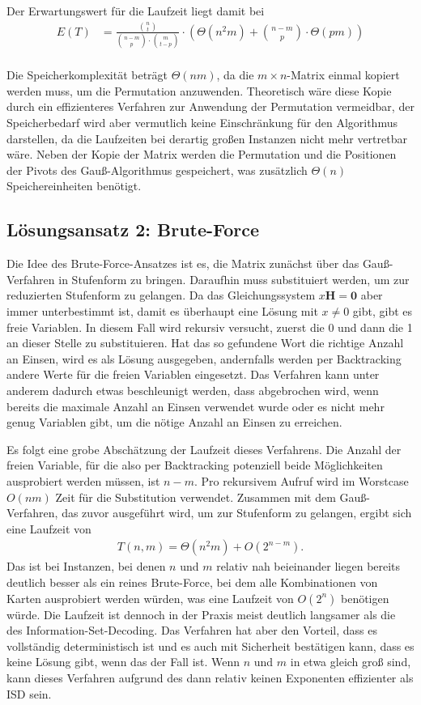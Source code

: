 \documentclass[a4paper,10pt,ngerman]{scrartcl}
\begin{document}
Der Erwartungswert für die Laufzeit liegt damit bei 
\begin{align*}
    E(T) &= \frac{\binom{n}{t}}{\binom{n-m}{p} \cdot \binom{m}{t-p}} \cdot \left(\Theta(n^2m) + \binom{n-m}{p}\cdot \Theta(pm)\right) \\
\end{align*}

Die Speicherkomplexität beträgt $\Theta(nm)$, da die $m \times n$-Matrix einmal kopiert werden muss, um die Permutation anzuwenden. Theoretisch wäre diese Kopie durch ein effizienteres Verfahren zur Anwendung der Permutation vermeidbar, der Speicherbedarf wird aber vermutlich keine Einschränkung für den Algorithmus darstellen, da die Laufzeiten bei derartig großen Instanzen nicht mehr vertretbar wäre. 
Neben der Kopie der Matrix werden die Permutation und die Positionen der Pivots des Gauß-Algorithmus gespeichert, was zusätzlich $\Theta(n)$ Speichereinheiten benötigt. 

\subsection{Lösungsansatz 2: Brute-Force}
Die Idee des Brute-Force-Ansatzes ist es, die Matrix zunächst über das Gauß-Verfahren in Stufenform zu bringen. Daraufhin muss substituiert werden, um zur reduzierten Stufenform zu gelangen. 
Da das Gleichungssystem $x\mathbf{H} = \mathbf{0}$ aber immer unterbestimmt ist, damit es überhaupt eine Lösung mit $x \neq 0$ gibt, gibt es freie Variablen.
In diesem Fall wird rekursiv versucht, zuerst die 0 und dann die 1 an dieser Stelle zu substituieren. 
Hat das so gefundene Wort die richtige Anzahl an Einsen, wird es als Lösung ausgegeben, andernfalls werden per Backtracking andere Werte für die freien Variablen eingesetzt. 
Das Verfahren kann unter anderem dadurch etwas beschleunigt werden, dass abgebrochen wird, wenn bereits die maximale Anzahl an Einsen verwendet wurde oder es nicht mehr genug Variablen gibt, um die nötige Anzahl an Einsen zu erreichen. 

Es folgt eine grobe Abschätzung der Laufzeit dieses Verfahrens.
Die Anzahl der freien Variable, für die also per Backtracking potenziell beide Möglichkeiten ausprobiert werden müssen, ist $n-m$. Pro rekursivem Aufruf wird im Worstcase $O(nm)$ Zeit für die Substitution verwendet. Zusammen mit dem Gauß-Verfahren, das zuvor ausgeführt wird, um zur Stufenform zu gelangen, ergibt sich eine Laufzeit von 
\begin{align*}
    T(n,m) = \Theta(n^2m) + O(2^{n-m}).
\end{align*}
Das ist bei Instanzen, bei denen $n$ und $m$ relativ nah beieinander liegen bereits deutlich besser als ein reines Brute-Force, bei dem alle Kombinationen von Karten ausprobiert werden würden, was eine Laufzeit von $O(2^n)$ benötigen würde.
Die Laufzeit ist dennoch in der Praxis meist deutlich langsamer als die des Information-Set-Decoding.  
Das Verfahren hat aber den Vorteil, dass es vollständig deterministisch ist und es auch mit Sicherheit bestätigen kann, dass es keine Lösung gibt, wenn das der Fall ist. 
Wenn $n$ und $m$ in etwa gleich groß sind, kann dieses Verfahren aufgrund des dann relativ keinen Exponenten effizienter als ISD sein.
\end{document}
